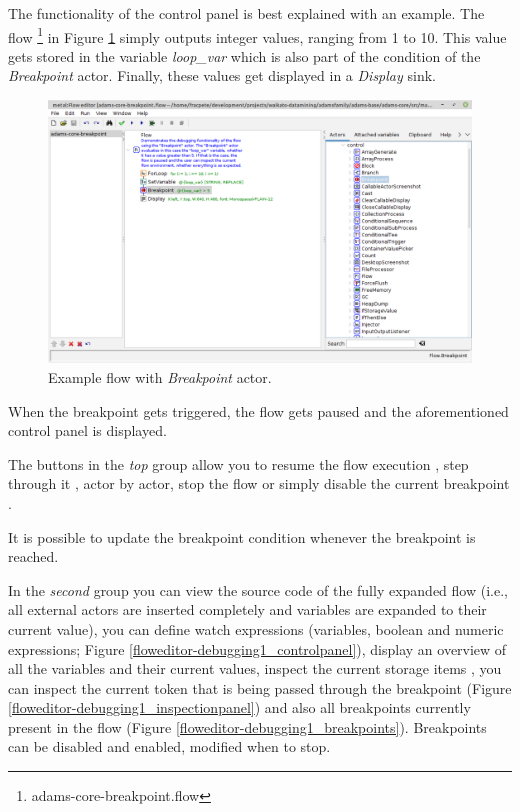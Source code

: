 The functionality of the control panel is best explained with an example. The
flow \footnote{adams-core-breakpoint.flow} in
Figure \ref{floweditor-debugging1_flow} simply outputs integer values, ranging
from 1 to 10. This value gets stored in the variable \textit{loop\_var} which is
also part of the condition of the \textit{Breakpoint} actor. Finally, these
values get displayed in a \textit{Display} sink.
\begin{figure}[htb] 
  \centering
  \includegraphics[width=12.0cm]{images/floweditor-debugging1_flow.png}
  \caption{Example flow with \textit{Breakpoint} actor.}
  \label{floweditor-debugging1_flow}
\end{figure}

When the breakpoint gets triggered, the flow gets paused and the aforementioned
control panel is displayed.
\begin{tight_itemize}
	\item The buttons in the \textit{top} group allow you to
	resume the flow execution , step through it ,
	actor by actor, stop the flow  or simply disable
	the current breakpoint .
	\item It is possible to update the breakpoint condition whenever the breakpoint
	is reached.
	\item In the \textit{second} group you can view the source code 
	of the fully expanded flow (i.e., all external actors are inserted completely and
	variables are expanded to their current value), you can define watch
	expressions  (variables, boolean and numeric expressions; Figure
	\ref{floweditor-debugging1_controlpanel}), display an overview of all the
	variables  and their current values, inspect the current storage
	items , you can inspect the current token 
	that is being passed through the breakpoint (Figure \ref{floweditor-debugging1_inspectionpanel})
	and also all breakpoints  currently present in the flow (Figure
	\ref{floweditor-debugging1_breakpoints}). Breakpoints can be disabled
	and enabled, modified when to stop.
\end{tight_itemize}

